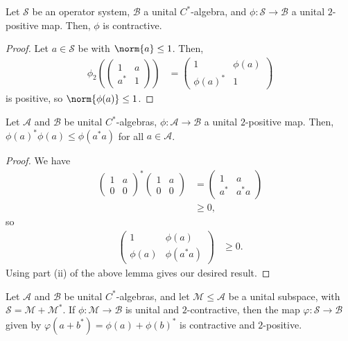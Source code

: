 \documentclass[10pt]{mypackage}
\begin{document}
\begin{proposition}
  Let $\mathcal{S}$ be an operator system, $\mathcal{B}$ a unital $C^{\ast}$-algebra, and $\phi\colon \mathcal{S}\rightarrow \mathcal{B}$ a unital $2$-positive map. Then, $\phi$ is contractive.
\end{proposition}
\begin{proof}
  Let $a\in \mathcal{S}$ be with $\norm{a}\leq 1$. Then,
  \begin{align*}
    \phi_2 \left( \begin{pmatrix}1 & a \\ a^{\ast} & 1\end{pmatrix} \right) &= \begin{pmatrix}1 & \phi(a)\\\phi(a)^{\ast} & 1\end{pmatrix}
  \end{align*}
  is positive, so $\norm{\phi(a)}\leq 1$.
\end{proof}
\begin{proposition}
  Let $\mathcal{A}$ and $\mathcal{B}$ be unital $C^{\ast}$-algebras, $\phi\colon \mathcal{A}\rightarrow \mathcal{B}$ a unital $2$-positive map. Then, $\phi(a)^{\ast}\phi(a)\leq \phi\left(a^{\ast}a\right)$ for all $a\in \mathcal{A}$.
\end{proposition}
\begin{proof}
  We have
  \begin{align*}
    \begin{pmatrix}1 & a \\ 0 & 0\end{pmatrix}^{\ast} \begin{pmatrix}1 & a \\ 0 & 0\end{pmatrix} &= \begin{pmatrix}1 & a \\ a^{\ast} & a^{\ast}a\end{pmatrix}\\
                     &\geq 0,
  \end{align*}
  so
  \begin{align*}
    \begin{pmatrix}1 & \phi(a) \\ \phi(a) & \phi\left( a^{\ast}a \right)\end{pmatrix} &\geq 0.
  \end{align*}
  Using part (ii) of the above lemma gives our desired result.
\end{proof}
\begin{proposition}
  Let $\mathcal{A}$ and $\mathcal{B}$ be unital $C^{\ast}$-algebras, and let $\mathcal{M}\leq \mathcal{A}$ be a unital subspace, with $\mathcal{S} = \mathcal{M} + \mathcal{M}^{\ast}$. If $\phi\colon \mathcal{M}\rightarrow \mathcal{B}$ is unital and $2$-contractive, then the map $\varphi\colon \mathcal{S}\rightarrow \mathcal{B}$ given by $\varphi\left( a + b^{\ast} \right) = \phi(a) + \phi(b)^{\ast}$ is contractive and $2$-positive.
\end{proposition}
\end{document}
